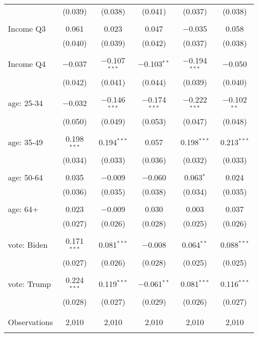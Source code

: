 \begin{tabular}{@{\extracolsep{5pt}}lccccc}
  & (0.039) & (0.038) & (0.041) & (0.037) & (0.038) \\ 
  & & & & & \\ 
 Income Q3 & 0.061 & 0.023 & 0.047 & $-$0.035 & 0.058 \\ 
  & (0.040) & (0.039) & (0.042) & (0.037) & (0.038) \\ 
  & & & & & \\ 
 Income Q4 & $-$0.037 & $-$0.107$^{***}$ & $-$0.103$^{**}$ & $-$0.194$^{***}$ & $-$0.050 \\ 
  & (0.042) & (0.041) & (0.044) & (0.039) & (0.040) \\ 
  & & & & & \\ 
 age: 25-34 & $-$0.032 & $-$0.146$^{***}$ & $-$0.174$^{***}$ & $-$0.222$^{***}$ & $-$0.102$^{**}$ \\ 
  & (0.050) & (0.049) & (0.053) & (0.047) & (0.048) \\ 
  & & & & & \\ 
 age: 35-49 & 0.198$^{***}$ & 0.194$^{***}$ & 0.057 & 0.198$^{***}$ & 0.213$^{***}$ \\ 
  & (0.034) & (0.033) & (0.036) & (0.032) & (0.033) \\ 
  & & & & & \\ 
 age: 50-64 & 0.035 & $-$0.009 & $-$0.060 & 0.063$^{*}$ & 0.024 \\ 
  & (0.036) & (0.035) & (0.038) & (0.034) & (0.035) \\ 
  & & & & & \\ 
 age: 64+ & 0.023 & $-$0.009 & 0.030 & 0.003 & 0.037 \\ 
  & (0.027) & (0.026) & (0.028) & (0.025) & (0.026) \\ 
  & & & & & \\ 
 vote: Biden & 0.171$^{***}$ & 0.081$^{***}$ & $-$0.008 & 0.064$^{**}$ & 0.088$^{***}$ \\ 
  & (0.027) & (0.026) & (0.028) & (0.025) & (0.025) \\ 
  & & & & & \\ 
 vote: Trump & 0.224$^{***}$ & 0.119$^{***}$ & $-$0.061$^{**}$ & 0.081$^{***}$ & 0.116$^{***}$ \\ 
  & (0.028) & (0.027) & (0.029) & (0.026) & (0.027) \\ 
  & & & & & \\ 
\hline \\[-1.8ex] 

Observations & 2,010 & 2,010 & 2,010 & 2,010 & 2,010 \\ 
\hline 
\hline \\[-1.8ex] 
\end{tabular} 